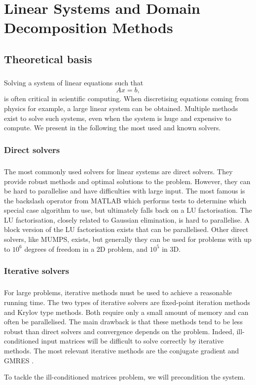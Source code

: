 \chapter{Linear Systems and Domain Decomposition Methods}

\section{Theoretical basis}

\paragraph{}
Solving a system of linear equations such that
\[Ax = b,\]
is often critical in scientific computing.
When discretising equations coming from physics for example, a large linear system can be obtained.
Multiple methods exist to solve such systems, even when the system is huge and expensive to compute.
We present in the following the most used and known solvers.

\subsection{Direct solvers}

\paragraph{}
The most commonly used solvers for linear systems are direct solvers.
They provide robust methods and optimal solutions to the problem.
However, they can be hard to parallelise and have difficulties with large input.
The most famous is the backslash operator from MATLAB which performs tests to determine which special case algorithm to use, but ultimately falls back on a LU factorisation.
The LU factorisation, closely related to Gaussian elimination, is hard to parallelise.
A block version of the LU factorisation exists that can be parallelised.
Other direct solvers, like MUMPS, exists, but generally they can be used for problems with up to \(10^6\) degrees of freedom in a 2D problem, and \(10^5\) in 3D.

\subsection{Iterative solvers}

\paragraph{}
For large problems, iterative methods must be used to achieve a reasonable running time.
The two types of iterative solvers are fixed-point iteration methods and Krylov type methods.
Both require only a small amount of memory and can often be parallelised.
The main drawback is that these methods tend to be less robust than direct solvers and convergence depends on the problem.
Indeed, ill-conditioned input matrices will be difficult to solve correctly by iterative methods.
The most relevant iterative methods are the conjugate gradient and GMRES \cite{saad_gmres_1986}.

To tackle the ill-conditioned matrices problem, we will precondition the system.
